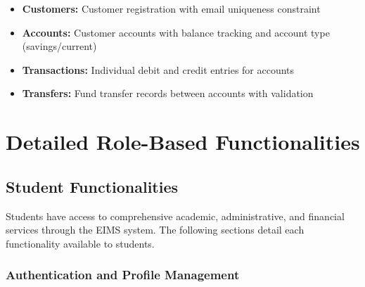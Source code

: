 \documentclass[12pt]{article}
\begin{document}
\begin{itemize}
    \item \textbf{Customers:} Customer registration with email uniqueness constraint
    \item \textbf{Accounts:} Customer accounts with balance tracking and account type (savings/current)
    \item \textbf{Transactions:} Individual debit and credit entries for accounts
    \item \textbf{Transfers:} Fund transfer records between accounts with validation
\end{itemize}

\newpage

\section{Detailed Role-Based Functionalities}

\subsection{Student Functionalities}

Students have access to comprehensive academic, administrative, and financial services through the EIMS system. The following sections detail each functionality available to students.

\subsubsection{Authentication and Profile Management}
\end{document}
